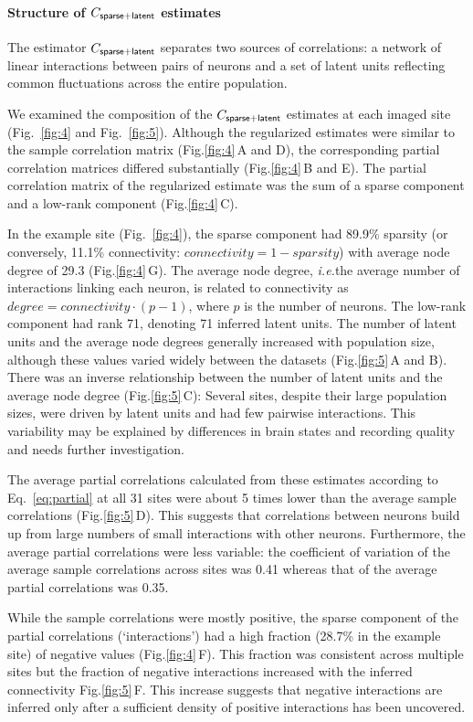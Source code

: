 \documentclass[10pt]{article}
\newcommand{\sq}[1]{\lq#1\rq}
\newcommand{\figref}[2]{Fig.\;\ref{fig:#1}\,#2}
\newcommand{\ie}{\emph{i.e.}\;}
\begin{document}
\paragraph{Structure of $C_{\sf sparse+latent}$ estimates}
The estimator $C_{\sf sparse+latent}$ separates two sources of correlations: a network of linear interactions between pairs of neurons and a set of latent units reflecting common fluctuations across the entire population.  

We examined the composition of the $C_{\sf sparse+latent}$ estimates at each imaged site (Fig.~\ref{fig:4} and Fig.~\ref{fig:5}). Although the regularized estimates were similar to the sample correlation matrix (\figref{4}{A and D}), the corresponding partial correlation matrices differed substantially (\figref{4}{B and E}). The partial correlation matrix of the regularized estimate was the sum of a sparse component and a low-rank component (\figref{4}{C}).  

In the example site (Fig.~\ref{fig:4}), the sparse component had 89.9\% sparsity (or conversely, 11.1\% connectivity: $connectivity=1-sparsity$) with average node degree of 29.3 (\figref{4}{G}). The average node degree, \ie the average number of interactions linking each neuron, is related to connectivity as $degree = connectivity\cdot(p-1)$, where $p$ is the number of neurons. The low-rank component had rank 71, denoting 71 inferred latent units. The number of latent units and the average node degrees generally increased with population size, although these values varied widely between the datasets (\figref{5}{A and B}). There was an inverse relationship between the number of latent units and the average node degree (\figref{5}{C}): Several sites, despite their large population sizes, were driven by latent units and had few pairwise interactions. This variability may be explained by differences in brain states and recording quality and needs further investigation.

The average partial correlations calculated from these estimates according to Eq.~\ref{eq:partial} at all 31 sites were about 5 times lower than the average sample correlations (\figref{5}{D}). This suggests that correlations between neurons build up from large numbers of small interactions with other neurons. Furthermore, the average partial correlations were less variable: the coefficient of variation of the average sample correlations across sites was 0.41 whereas that of the average partial correlations was 0.35. 

While the sample correlations were mostly positive, the sparse component of the partial correlations (\sq{interactions}) had a high fraction (28.7\% in the example site) of negative values (\figref{4}{F}). This fraction was consistent across multiple sites but the fraction of negative interactions increased with the inferred connectivity \figref{5}{F}.  This increase suggests that negative interactions are inferred only after a sufficient density of positive interactions has been uncovered.
\end{document}
